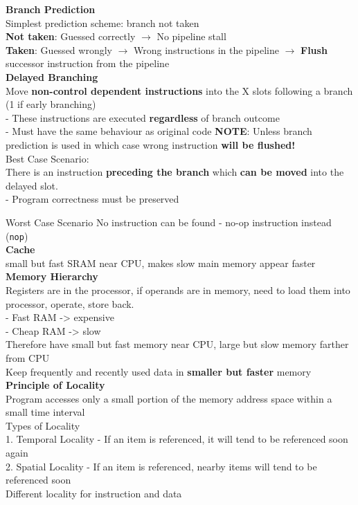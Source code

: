 \documentclass[10pt, a4paper]{article}
\newcommand{\highlight}[1]{{\color{red}\textbf{#1}}}
\begin{document}
\begin{multicols*}{3}
		\textbf{Branch Prediction}\\
		Simplest prediction scheme: branch not taken\\
		\highlight{Not taken}: Guessed correctly $\rightarrow$ No pipeline stall\\
		\highlight{Taken}: Guessed wrongly $\rightarrow$ Wrong instructions in the pipeline $\rightarrow$ \textbf{Flush} successor instruction from the pipeline\\
		
		\textbf{Delayed Branching}\\
		Move \textbf{non-control dependent instructions} into the X slots following a branch (1 if early branching)\\
		- These instructions are executed \textbf{regardless} of branch outcome\\
		- Must have the same behaviour as original code
		\highlight{NOTE}: Unless branch prediction is used in which case wrong instruction \textbf{will be flushed!}\\
		
		Best Case Scenario:\\
		There is an instruction \textbf{preceding the branch} which \textbf{can be moved} into the delayed slot.\\
		- Program correctness must be preserved
		
		Worst Case Scenario
		No instruction can be found
		- no-op instruction instead (\texttt{nop})\\

		{\normalsize\textbf{Cache}}\\
		small but fast SRAM near CPU, makes slow main memory appear faster\\

		\textbf{Memory Hierarchy}\\
		Registers are in the processor, if operands are in memory, need to load them into processor, operate, store back.\\
		- Fast RAM -> expensive\\
		- Cheap RAM -> slow\\
		Therefore have small but fast memory near CPU, large but slow memory farther from CPU\\
		Keep frequently and recently used data in \highlight{smaller but faster} memory\\

		\textbf{Principle of Locality}\\
		Program accesses only a small portion of the memory address space within a small time interval\\
		Types of Locality\\
		1. Temporal Locality - If an item is referenced, it will tend to be referenced soon again\\
		2. Spatial Locality - If an item is referenced, nearby items will tend to be referenced soon\\
		Different locality for instruction and data\\


\end{multicols*}
\end{document}
